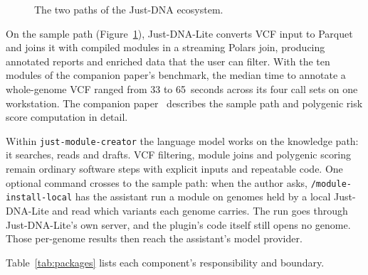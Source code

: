 \documentclass[11pt,a4paper]{article}
\begin{document}
\begin{figure}[ht]
\caption{The two paths of the Just-DNA ecosystem.}
\label{fig:architecture}
\end{figure}

On the sample path (Figure~\ref{fig:architecture}), Just-DNA-Lite converts VCF
input to Parquet and joins it with compiled modules in a streaming Polars join, producing
annotated reports and enriched data that the user can filter. With the ten modules of the companion paper's benchmark, the median time to
annotate a whole-genome VCF ranged from 33 to 65~seconds across its four call
sets on one workstation. The companion paper~\citep{companion2026justdnalite} describes the
sample path and polygenic risk score computation in detail.

Within \texttt{just-module-creator} the language model works on the
knowledge path: it searches, reads and drafts. VCF filtering, module joins and
polygenic scoring remain ordinary software steps with explicit inputs and
repeatable code. One optional command crosses to the sample path: when the
author asks, \texttt{/module-install-local} has the assistant run a module on
genomes held by a local Just-DNA-Lite and read which variants each genome
carries. The run goes through Just-DNA-Lite's own server, and the plugin's code
itself still opens no genome. Those per-genome results then reach the assistant's model provider.

Table~\ref{tab:packages} lists each component's responsibility and boundary.
\end{document}
